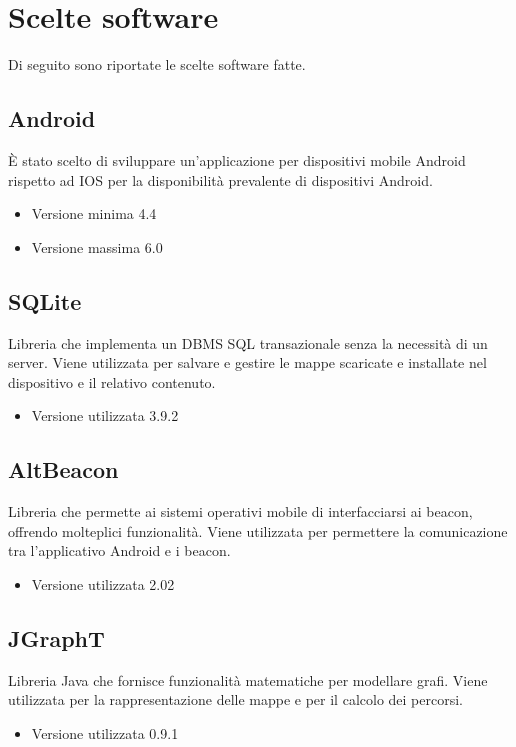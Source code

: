 \documentclass[../DocumentazioneDelloStudio.tex]{subfiles}
\begin{document}
\section{Scelte software}
	Di seguito sono riportate le scelte software fatte.

	\subsection{Android}
		È stato scelto di sviluppare un'applicazione per dispositivi mobile Android rispetto ad IOS per la disponibilità prevalente di dispositivi Android.
		\begin{itemize} 
			\item Versione minima 4.4 
			\item Versione massima 6.0
		\end{itemize}

	\subsection{SQLite}
		Libreria che implementa un DBMS SQL transazionale senza la necessità di un server. Viene utilizzata per salvare e gestire le mappe scaricate e installate nel dispositivo e il relativo contenuto.
		\begin{itemize} \item Versione utilizzata 3.9.2\end{itemize}

	\subsection{AltBeacon}
		Libreria che permette ai sistemi operativi mobile di interfacciarsi ai beacon, offrendo molteplici funzionalità. Viene utilizzata per permettere la comunicazione tra l'applicativo Android e i beacon.
		\begin{itemize} \item Versione utilizzata 2.02\end{itemize}
		
	\subsection{JGraphT}
		Libreria Java che fornisce funzionalità matematiche per modellare grafi. Viene utilizzata per la rappresentazione delle mappe e per il calcolo dei percorsi. 
		\begin{itemize} \item Versione utilizzata 0.9.1\end{itemize}
\end{document}
